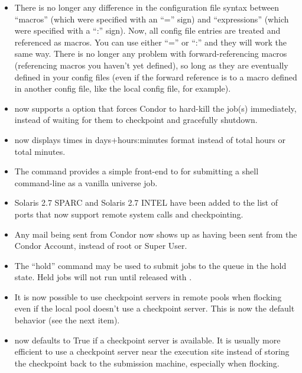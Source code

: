 \begin{itemize}

\item There is no longer any difference in the configuration file
syntax between ``macros'' (which were specified with an ``='' sign)
and ``expressions'' (which were specified with a ``:'' sign).  
Now, all config file entries are treated and referenced as macros. 
You can use either ``='' or ``:'' and they will work the same way. 
There is no longer any problem with forward-referencing macros
(referencing macros you haven't yet defined), so long as they are
eventually defined in your config files (even if the forward reference
is to a macro defined in another config file, like the local config
file, for example).

\item {} now supports a  option that forces
Condor to hard-kill the job(s) immediately, instead of waiting for
them to checkpoint and gracefully shutdown.

\item {} now displays times in days+hours:minutes format
instead of total hours or total minutes.

\item The  command provides a simple front-end to
 for submitting a shell command-line as a vanilla
universe job.

\item Solaris 2.7 SPARC and Solaris 2.7 INTEL have been added to the
list of ports that now support remote system calls and checkpointing.

\item Any mail being sent from Condor now shows up as having been sent from
the Condor Account, instead of root or Super User.

\item The  ``hold'' command may be used to submit jobs
to the queue in the hold state.  Held jobs will not run until released
with .

\item It is now possible to use checkpoint servers in remote pools
when flocking even if the local pool doesn't use a checkpoint server.
This is now the default behavior (see the next item).

\item {} now defaults to True if a checkpoint
server is available.  It is usually more efficient to use a checkpoint
server near the execution site instead of storing the checkpoint back
to the submission machine, especially when flocking.


\end{itemize}
